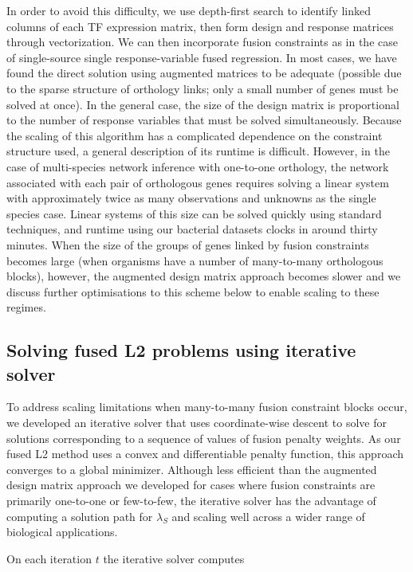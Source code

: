 \documentclass[11pt]{article}
\begin{document}
In order to avoid this difficulty, we use depth-first search to identify linked columns of each TF expression matrix, then form design and response matrices through vectorization. 
We can then incorporate fusion constraints as in the case of single-source single response-variable fused regression. 
In most cases, we have found the direct solution using augmented matrices to be adequate (possible due to the sparse structure of orthology links; only a small number of genes must be solved at once). 
In the general case, the size of the design matrix is proportional to the number of response variables that must be solved simultaneously. 
Because the scaling of this algorithm has a complicated dependence on the constraint structure used, a general description of its runtime is difficult. 
However, in the case of multi-species network inference with one-to-one orthology, the network associated with each pair of orthologous genes requires solving a linear system with approximately twice as many observations and unknowns as the single species case. 
Linear systems of this size can be solved quickly using standard techniques, and runtime using our bacterial datasets clocks in around thirty minutes. 
When the size of the groups of genes linked by fusion constraints becomes large (when organisms have a number of many-to-many orthologous blocks), however, the augmented design matrix approach becomes slower and we discuss further optimisations to this scheme below to enable scaling to these regimes.


\subsection{Solving fused L2 problems using iterative solver}

To address scaling limitations when many-to-many fusion constraint blocks occur, we developed an iterative solver that uses coordinate-wise descent to solve for solutions corresponding to a sequence of values of fusion penalty weights. 
As our fused L2 method uses a convex and differentiable penalty function, this approach converges to a global minimizer. 
Although less efficient than the augmented design matrix approach we developed for cases where fusion constraints are primarily one-to-one or few-to-few, the iterative solver has the advantage of computing a solution path for $\lambda_S$ and scaling well across a wider range of biological applications.

On each iteration $t$ the iterative solver computes
\end{document}
